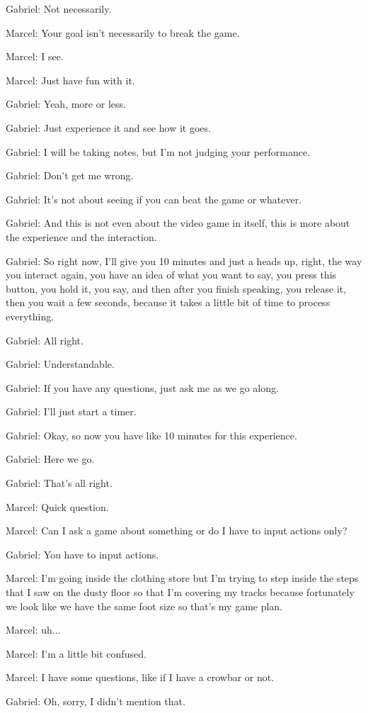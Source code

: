 Gabriel: Not necessarily.

Marcel: Your goal isn't necessarily to break the game.

Marcel: I see.

Marcel: Just have fun with it.

Gabriel: Yeah, more or less.

Gabriel: Just experience it and see how it goes.

Gabriel: I will be taking notes, but I'm not judging your performance.

Gabriel: Don't get me wrong.

Gabriel: It's not about seeing if you can beat the game or whatever.

Gabriel: And this is not even about the video game in itself, this is more about the experience and the interaction.

Gabriel: So right now, I'll give you 10 minutes and just a heads up, right, the way you interact again, you have an idea of what you want to say, you press this button, you hold it, you say, and then after you finish speaking, you release it, then you wait a few seconds, because it takes a little bit of time to process everything.

Gabriel: All right.

Gabriel: Understandable.

Gabriel: If you have any questions, just ask me as we go along.

Gabriel: I'll just start a timer.

Gabriel: Okay, so now you have like 10 minutes for this experience.

Gabriel: Here we go.

Gabriel: That's all right.

Marcel: Quick question.

Marcel: Can I ask a game about something or do I have to input actions only?

Gabriel: You have to input actions.

Marcel: I'm going inside the clothing store but I'm trying to step inside the steps that I saw on the dusty floor so that I'm covering my tracks because fortunately we look like we have the same foot size so that's my game plan.

Marcel: uh...

Marcel: I'm a little bit confused.

Marcel: I have some questions, like if I have a crowbar or not.

Gabriel: Oh, sorry, I didn't mention that.

